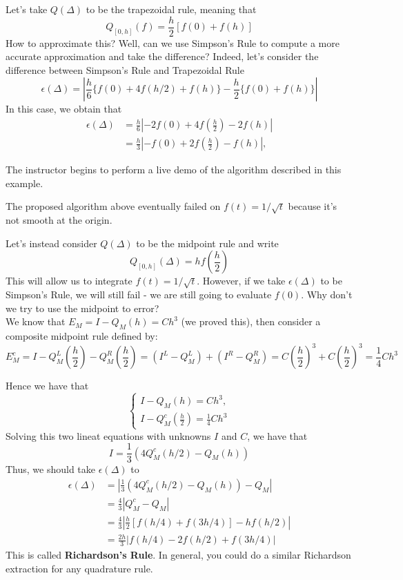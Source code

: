 \documentclass{article}
\begin{document}
\begin{example}
    Let's take $Q(\Delta)$ to be the trapezoidal rule, meaning that
    \[Q_{[0, h]}(f) = \frac{h}{2} [f(0) + f(h)]\]
    How to approximate this? Well, can we use Simpson's Rule to compute a more accurate approximation and take the difference? Indeed, let's consider the difference between Simpson's Rule and Trapezoidal Rule
    \[\epsilon(\Delta) = |\frac{h}{6} \{f(0) + 4 f(h/2) + f(h)\} - \frac{h}{2} \{f(0) + f(h)\}|\]
    In this case, we obtain that
    \begin{align*}
        \epsilon(\Delta) &= \frac{h}{6} |-2f(0) + 4 f(\frac{h}{2}) - 2 f(h)|\\
        &= \frac{h}{3} |-f(0) + 2 f(\frac{h}{2}) - f(h)|, \tag*{We have $\Delta = (0, h)$}
    \end{align*}
\end{example}

The instructor begins to perform a live demo of the algorithm described in this example.


The proposed algorithm above eventually failed on $f(t) = 1/\sqrt{t}$ because it's not smooth at the origin.

\begin{example}
    Let's instead consider $Q(\Delta)$ to be the midpoint rule and write
    \[Q_{[0,h]}(\Delta) = h f(\frac{h}{2})\]
    This will allow us to integrate $f(t) = 1/\sqrt{t}$. However, if we take $\epsilon(\Delta)$ to be Simpson's Rule, we will still fail - we are still going to evaluate $f(0)$. Why don't we try to use the midpoint to error?\\

    We know that $E_M = I - Q_M(h) = C h^3 $ (we proved this), then consider a composite midpoint rule defined by:
    \[E_M^c= I - Q_M^L(\frac{h}{2}) - Q_M^R(\frac{h}{2}) = (I^L - Q_M^L) + (I^R - Q_M^R) = C(\frac{h}{2})^3 + C(\frac{h}{2})^3 = \frac{1}{4} C h^3\]

    Hence we have that
    \[\begin{cases}
        I - Q_M(h) = C h^3,\\
        I - Q_M^c(\frac{h}{2}) = \frac{1}{4} C h^3
    \end{cases}\]
    Solving this two lineat equations with unknowns $I$ and $C$, we have that
    \[I = \frac{1}{3} (4 Q_M^c(h/2) - Q_M(h))\]
    Thus, we should take $\epsilon(\Delta)$ to
    \begin{align*}
        \epsilon(\Delta) &= |\frac{1}{3} (4 Q_M^c(h/2) - Q_M(h)) - Q_M|\\
        &= \frac{4}{3} |Q_M^c - Q_M|\\
        &= \frac{4}{3} |\frac{h}{2} [f(h/4) + f(3h/4)] - h f(h/2)|\\
        &= \frac{2h}{3} |f(h/4) - 2 f(h/2) + f(3h/4)|
    \end{align*}
    This is called \textbf{Richardson's Rule}. In general, you could do a similar Richardson extraction for any quadrature rule.
\end{example}
\end{document}
